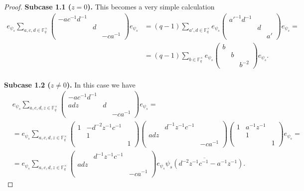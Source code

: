 \documentclass[12pt,reqno]{amsart}
\theoremstyle{definition}
\theoremstyle{remark}
\numberwithin{equation}{section}
\begin{document}
\begin{proof}
    \textbf{Subcase 1.1 ($z = 0$).} This becomes a very simple calculation
    \begin{align*}
        e_{\psi_s} \sum_{a, c, d \in \mathbb{F}_q^\times} \begin{pmatrix}
            -ac^{-1}d^{-1} & &\\
            & d & \\
            & & -ca^{-1}
        \end{pmatrix} e_{\psi_s} &= (q-1) \sum_{a', d \in \mathbb{F}_q^\times}e_{\psi_s} \begin{pmatrix}
            a'^{-1}d^{-1} & &\\
            & d &\\
            & & a'
        \end{pmatrix}e_{\psi_s}=\\
        &= (q-1) \sum_{b \in \mathbb{F}_q^\times} e_{\psi_s} \begin{pmatrix}
            b & & \\
            & b & \\
            & & b^{-2}
        \end{pmatrix} e_{\psi_s}.
    \end{align*}\\
    
    \textbf{Subcase 1.2 ($z \ne 0$).} In this case we have
    \begin{align*}
        &e_{\psi_s} \sum_{a, c, d, z \in \mathbb{F}_q^\times} \begin{pmatrix}
            -ac^{-1}d^{-1} & &\\
            adz & d & \\
            & & -ca^{-1}
        \end{pmatrix} e_{\psi_s}=\\
        &= e_{\psi_s} \sum_{a, c, d, z \in \mathbb{F}_q^\times} \begin{pmatrix}
            1 & -d^{-2}z^{-1}c^{-1} &\\
            & 1 &\\
            & & 1
        \end{pmatrix} \begin{pmatrix}
            & d^{-1}z^{-1}c^{-1} & \\
            adz & & \\
            & & -ca^{-1}
        \end{pmatrix} \begin{pmatrix}
            1 & a^{-1}z^{-1} &\\
            & 1 &\\
            & & 1
        \end{pmatrix} e_{\psi_s}=\\
        &=e_{\psi_s} \sum_{a, c, d, z \in \mathbb{F}_q^\times}
        \begin{pmatrix}
            & d^{-1}z^{-1}c^{-1} & \\
            adz & & \\
            & & -ca^{-1}
        \end{pmatrix} e_{\psi_s} \overline{\psi_s(d^{-2}z^{-1}c^{-1}-a^{-1}z^{-1})}.
    \end{align*}


\end{proof}
\end{document}
